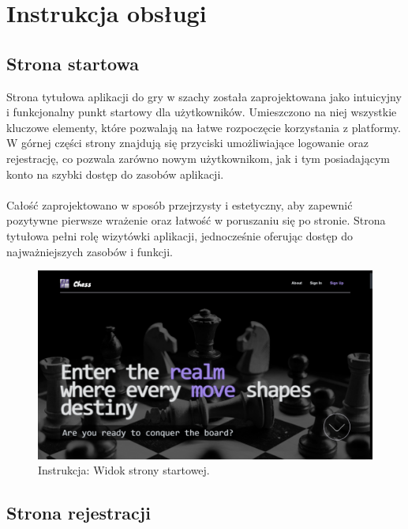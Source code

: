 \documentclass[twoside]{projektInzynierskiMS1}
\begin{document}
\newpage

\section{Instrukcja obsługi}

\subsection{Strona startowa}

\noindent
Strona tytułowa aplikacji do gry w szachy została zaprojektowana jako intuicyjny i funkcjonalny punkt startowy dla użytkowników. Umieszczono na niej wszystkie kluczowe elementy, które pozwalają na łatwe rozpoczęcie korzystania z platformy. W górnej części strony znajdują się przyciski umożliwiające logowanie oraz rejestrację, co pozwala zarówno nowym użytkownikom, jak i tym posiadającym konto na szybki dostęp do zasobów aplikacji.
\\\\
Całość zaprojektowano w sposób przejrzysty i estetyczny, aby zapewnić pozytywne pierwsze wrażenie oraz łatwość w poruszaniu się po stronie. Strona tytułowa pełni rolę wizytówki aplikacji, jednocześnie oferując dostęp do najważniejszych zasobów i funkcji.

\vspace{0.5cm}
\begin{figure}[h!]
    \centering
    \includegraphics[width=1\textwidth]{images/ins_hero.png}
    \caption{Instrukcja: Widok strony startowej.}
\end{figure}
\vspace{0.5cm}

\newpage

\subsection{Strona rejestracji}
\end{document}
